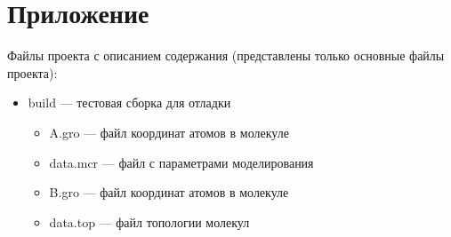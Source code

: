 \appendix
\section{Приложение}

Файлы проекта с описанием содержания (представлены только основные файлы проекта):
\begin{itemize}
	\item build --- тестовая сборка для отладки
	\begin{itemize}
		\item A.gro --- файл координат атомов в молекуле
		\item data.mcr --- файл с параметрами моделирования
		\item B.gro  --- файл координат атомов в молекуле 
		\item data.top --- файл топологии молекул
		

\end{itemize}
\end{itemize}
